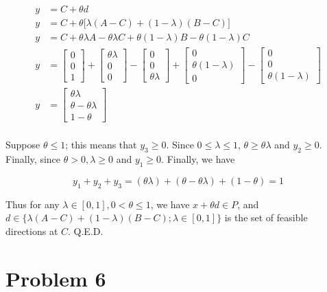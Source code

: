 \documentclass[11pt]{article}
\begin{document}
\begin{equation}
\begin{split}
y &= C + \theta d\\
y &= C + \theta\bigl[\lambda (A-C) + (1-\lambda) (B-C)\bigr]\\
y &= C + \theta\lambda A - \theta\lambda C + \theta(1-\lambda)B - \theta(1-\lambda)C \\
y &= \begin{bmatrix}0\\0\\1\end{bmatrix} + \begin{bmatrix}\theta\lambda\\0\\0\end{bmatrix} - \begin{bmatrix}0\\0\\\theta\lambda\end{bmatrix} + \begin{bmatrix}0\\\theta(1-\lambda)\\0\end{bmatrix} - \begin{bmatrix}0\\0\\\theta(1-\lambda)\end{bmatrix} \\
y &= \begin{bmatrix}\theta\lambda\\\theta-\theta\lambda\\1-\theta\end{bmatrix}\\
\end{split}
\end{equation}

Suppose $\theta\leq 1$; this means that $y_3\geq 0$. Since $0\leq \lambda \leq 1$, $\theta \geq \theta \lambda$ and $y_2\geq 0$. Finally, since $\theta>0, \lambda \geq 0$ and $y_1\geq 0$. Finally, we have 

$$
y_1+y_2+y_3=(\theta\lambda) + (\theta - \theta\lambda) + (1-\theta)=1
$$

Thus for any $\lambda\in[0,1], 0<\theta\leq 1$, we have $x+\theta d\in P$, and $d\in\{\lambda(A-C) + (1-\lambda) (B-C); \lambda\in[0, 1]\}$ is the set of feasible directions at $C$. Q.E.D.

\section*{Problem 6}
\end{document}
